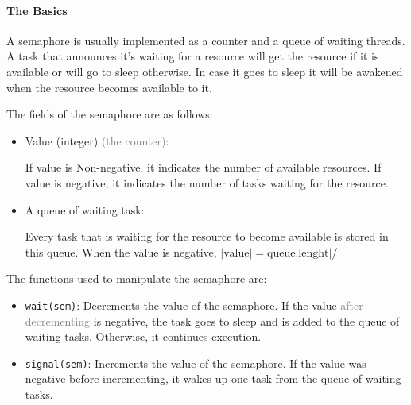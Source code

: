 \documentclass[openany,12pt]{book}
\newcommand{\code}[1]{\texttt{#1}}
\newcommand{\gray}[1]{\textcolor{gray}{#1}}
\begin{document}
\paragraph{The Basics} A semaphore is usually implemented as a counter and a queue of waiting threads. A task that announces it's waiting for a resource will get the resource if it is available or will go to sleep otherwise. In case it goes to sleep it will be awakened when the resource becomes available to it.

The fields of the semaphore are as follows:
\begin{itemize}
  \item Value (integer) \gray{(the counter)}:\par
        If value is Non-negative, it indicates the number of available resources. If value is negative, it indicates the number of tasks waiting for the resource.

  \item A queue of waiting task: \par
        Every task that is waiting for the resource to become available is stored in this queue. When the value is negative, \(|\text{value}| = \text{queue.lenght}|\)/

\end{itemize}


The functions used to manipulate the semaphore are:
\begin{itemize}
  \item \code{wait(sem)}: Decrements the value of the semaphore. If the value \gray{after decrementing} is negative, the task goes to sleep and is added to the queue of waiting tasks. Otherwise, it continues execution.

  \item \code{signal(sem)}: Increments the value of the semaphore. If the value was negative before incrementing, it wakes up one task from the queue of waiting tasks.
\end{itemize}
\end{document}
